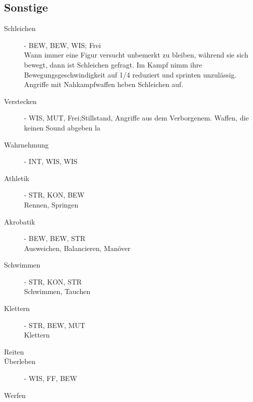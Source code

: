 \documentclass[a4paper,12pt,oneside]{book}
\begin{document}
\subsection{Sonstige}
\begin{description}
\item[Schleichen]- BEW, BEW, WIS; Frei
\\Wann immer eine Figur versucht unbemerkt zu bleiben, während sie sich bewegt, dann ist Schleichen gefragt. Im Kampf nimm ihre Bewegungsgeschwindigkeit auf 1/4 reduziert und sprinten unzulässig. Angriffe mit Nahkampfwaffen heben Schleichen auf.
\item[Verstecken]- WIS, MUT,  Frei;Stillstand, Angriffe aus dem Verborgenem. Waffen, die keinen Sound abgeben la
\item[Wahrnehmung]- INT, WIS, WIS
\item[Athletik]- STR, KON, BEW
\\Rennen, Springen 
\item[Akrobatik]- BEW, BEW, STR
\\Ausweichen, Balancieren, Manöver
\item[Schwimmen]- STR, KON, STR
\\Schwimmen, Tauchen
\item[Klettern]- STR, BEW, MUT
\\Klettern
\item[Reiten]
\item[Überleben]- WIS, FF, BEW
\item[Werfen]

\end{description}
\end{document}
